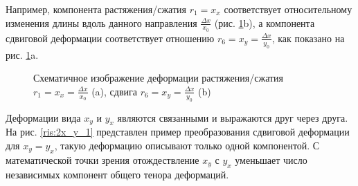  Например, компонента растяжения/сжатия $r_1= x_x $ соответствует относительному изменения
 длины вдоль данного направления $\frac{\Delta x}{x_0}$ (рис. \ref{ris:deform_piezo}b), а
 компонента сдвиговой деформации соответствует отношению $r_6= x_y = \frac{\Delta x}{y_0}$,
 как показано на рис. \ref{ris:deform_piezo}a.
\begin{figure}[H]
  \centering
  \hfill
  \caption{Схематичное изображение деформации
  растяжения/сжатия $r_1= x_x = \frac{\Delta x}{x_0}$ (a),
   сдвига  $r_6= x_y = \frac{\Delta x}{y_0} $ (b)  }
  \label{ris:deform_piezo}
\end{figure}

Деформации вида $x_y$ и $y_x$ являются связанными и выражаются друг через друга.
На рис. \ref{ris:2x_y_1} представлен пример преобразования сдвиговой деформации
для $x_y = y_x$, такую деформацию описывают только одной компонентой.
С математической точки зрения отождествление $x_y$ с $y_x$
уменьшает число независимых компонент общего тенора деформаций.

